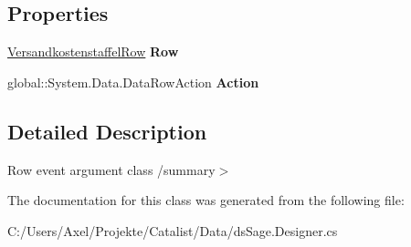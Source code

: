 \subsection*{Properties}
\begin{DoxyCompactItemize}
\item 
\hyperlink{class_products_1_1_data_1_1ds_sage_1_1_versandkostenstaffel_row}{Versandkostenstaffel\+Row} {\bfseries Row}\hypertarget{class_products_1_1_data_1_1ds_sage_1_1_versandkostenstaffel_row_change_event_a1f3282b7c0ca95caad842a49872ab77c}{}\label{class_products_1_1_data_1_1ds_sage_1_1_versandkostenstaffel_row_change_event_a1f3282b7c0ca95caad842a49872ab77c}

\item 
global\+::\+System.\+Data.\+Data\+Row\+Action {\bfseries Action}\hypertarget{class_products_1_1_data_1_1ds_sage_1_1_versandkostenstaffel_row_change_event_a330e4997b2a0ab058e9cc1b6124b2aab}{}\label{class_products_1_1_data_1_1ds_sage_1_1_versandkostenstaffel_row_change_event_a330e4997b2a0ab058e9cc1b6124b2aab}

\end{DoxyCompactItemize}


\subsection{Detailed Description}
Row event argument class /summary$>$ 

The documentation for this class was generated from the following file\+:\begin{DoxyCompactItemize}
\item 
C\+:/\+Users/\+Axel/\+Projekte/\+Catalist/\+Data/ds\+Sage.\+Designer.\+cs\end{DoxyCompactItemize}
